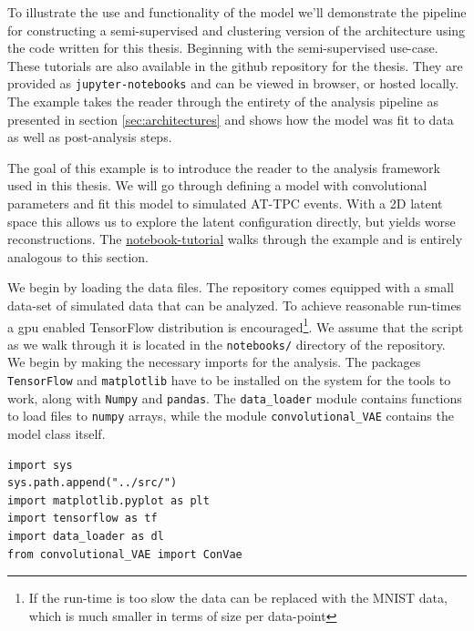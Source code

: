 To illustrate the use and functionality of the model we'll demonstrate the pipeline for constructing a semi-supervised and clustering version of the architecture using the code written for this thesis. Beginning with the semi-supervised use-case. These tutorials are also available in the github repository for the thesis. They are provided as \lstinline{jupyter-notebooks} and can be viewed in browser, or hosted locally. The example takes the reader through the entirety of the analysis pipeline as presented in section \ref{sec:architectures} and shows how the model was fit to data as well as post-analysis steps. 

The goal of this example is to introduce the reader to the analysis framework used in this thesis. We will go through defining a model with convolutional parameters and fit this model to simulated AT-TPC events. With a 2D latent space this allows us to explore the latent configuration directly, but yields worse reconstructions. The \href{https://github.com/ATTPC/VAE-event-classification/blob/master/notebooks/simulated_tutorial.ipynb}{notebook-tutorial} walks through the example and is entirely analogous to this section.

We begin by loading the data files. The repository comes equipped with a small data-set of simulated data that can be analyzed. To achieve reasonable run-times a gpu enabled TensorFlow distribution is encouraged\footnote{If the run-time is too slow the data can be replaced with the MNIST data, which is much smaller in terms of size per data-point}. We assume that the script as we walk through it is located in the \lstinline{notebooks/} directory of the repository. We begin by making the necessary imports for the analysis. The packages \lstinline{TensorFlow} and \lstinline{matplotlib} have to be installed on the system for the tools to work, along with \lstinline{Numpy} and \lstinline{pandas}. The \lstinline{data_loader} module contains functions to load files to \lstinline{numpy} arrays, while the module \lstinline{convolutional_VAE} contains the model class itself.

\begin{minipage}{\linewidth}
\begin{lstlisting}[language=iPython]
import sys
sys.path.append("../src/")
import matplotlib.pyplot as plt
import tensorflow as tf
import data_loader as dl
from convolutional_VAE import ConVae
\end{lstlisting}
\end{minipage}

